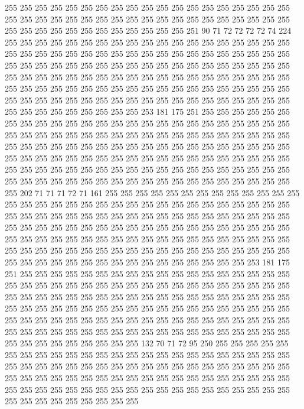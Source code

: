 255 255 255 255 255 255 255 255 255 255 255 255 255 255 255 255 255 255 255 255
255 255 255 255 255 255 255 255 255 255 255 255 255 255 255 255 255 255 255 255
255 255 255 255 255 255 255 255 255 255 251 90 71 72 72 72 72 74 224 255
255 255 255 255 255 255 255 255 255 255 255 255 255 255 255 255 255 255 255 255
255 255 255 255 255 255 255 255 255 255 255 255 255 255 255 255 255 255 255 255
255 255 255 255 255 255 255 255 255 255 255 255 255 255 255 255 255 255 255 255
255 255 255 255 255 255 255 255 255 255 255 255 255 255 255 255 255 255 255 255
255 255 255 255 255 255 255 255 255 255 255 255 255 255 255 255 255 255 255 255
255 255 255 255 255 255 255 255 255 255 255 255 255 255 255 255 255 255 255 255
255 255 253 181 175 251 255 255 255 255 255 255 255 255 255 255 255 255 255 255
255 255 255 255 255 255 255 255 255 255 255 255 255 255 255 255 255 255 255 255
255 255 255 255 255 255 255 255 255 255 255 255 255 255 255 255 255 255 255 255
255 255 255 255 255 255 255 255 255 255 255 255 255 255 255 255 255 255 255 255
255 255 255 255 255 255 255 255 255 255 255 255 255 255 255 255 255 255 255 255
255 255 255 255 255 255 255 255 255 255 255 255 255 255 255 255 255 255 255 255
255 255 255 255 255 255 255 202 71 71 71 72 71 161 255 255 255 255 255 255
255 255 255 255 255 255 255 255 255 255 255 255 255 255 255 255 255 255 255 255
255 255 255 255 255 255 255 255 255 255 255 255 255 255 255 255 255 255 255 255
255 255 255 255 255 255 255 255 255 255 255 255 255 255 255 255 255 255 255 255
255 255 255 255 255 255 255 255 255 255 255 255 255 255 255 255 255 255 255 255
255 255 255 255 255 255 255 255 255 255 255 255 255 255 255 255 255 255 255 255
255 255 255 255 255 255 255 255 255 255 255 255 255 255 255 255 255 255 253 181
175 251 255 255 255 255 255 255 255 255 255 255 255 255 255 255 255 255 255 255
255 255 255 255 255 255 255 255 255 255 255 255 255 255 255 255 255 255 255 255
255 255 255 255 255 255 255 255 255 255 255 255 255 255 255 255 255 255 255 255
255 255 255 255 255 255 255 255 255 255 255 255 255 255 255 255 255 255 255 255
255 255 255 255 255 255 255 255 255 255 255 255 255 255 255 255 255 255 255 255
255 255 255 255 255 255 255 255 255 255 255 255 255 255 255 255 255 255 255 255
255 255 255 255 132 70 71 72 95 250 255 255 255 255 255 255 255 255 255 255
255 255 255 255 255 255 255 255 255 255 255 255 255 255 255 255 255 255 255 255
255 255 255 255 255 255 255 255 255 255 255 255 255 255 255 255 255 255 255 255
255 255 255 255 255 255 255 255 255 255 255 255 255 255 255 255 255 255 255 255
255 255 255 255 255 255 255 255 255 255 255 255 255 255 255 255 255 255 255 255
